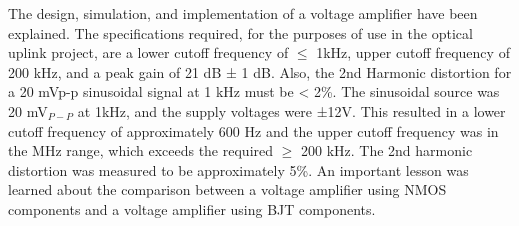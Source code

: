 
	The design, simulation, and implementation of a voltage amplifier have been explained. The specifications required, for the purposes of use in the optical uplink project, are a lower cutoff frequency of $\le$ 1kHz, upper cutoff frequency of 200 kHz, and a peak gain of 21 dB ± 1 dB. Also, the 2nd Harmonic distortion for a 20 mVp-p sinusoidal signal at 1 kHz must be < 2\%. The sinusoidal source was 20 mV$_{P-P}$ at 1kHz, and the supply voltages were ±12V. This resulted in a lower cutoff frequency of approximately 600 Hz and the upper cutoff frequency was in the MHz range, which exceeds the required $\ge$ 200 kHz. The 2nd harmonic distortion was measured to be approximately 5\%. An important lesson was learned about the comparison between a voltage amplifier using NMOS components and a voltage amplifier using BJT components.


